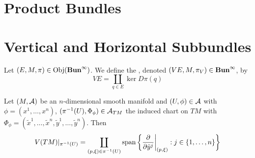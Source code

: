 \documentclass{book}
\begin{document}
	
	
	
	
	
	
	
	
	
	
	
	
	
	
	
	
	
	
	
	
	
	
	
	
	
	
	
	
	
	
	
	\newpage
	\section{Product Bundles}
	
	\begin{defn}
		
	\end{defn}
	
	
	
	
	
	
	
	
	
	
	
	
	
	
	
	
	
	
	
	
	
	
	
	
	
	
	
	
	
	
	
	
	
	
	
	
	
	
	
	
	
	
	\newpage
	\section{Vertical and Horizontal Subbundles}
	
	\begin{defn}
		Let $(E, M, \pi) \in \operatorname{Obj}(\operatorname*{\text{\textbf{Bun}}^{\infty}})$. We define the , denoted $(VE, M, \pi_{V}) \in \operatorname*{\text{\textbf{Bun}}^{\infty}}$, by 
		$$VE = \coprod_{q \in E} \ker D\pi(q)$$
	\end{defn}
	
	
	\begin{ex}
		Let $(M, \mathcal{A})$ be an $n$-dimensional smooth manifold and $(U, \phi) \in \mathcal{A}$ with $\phi = (x^1, \ldots, x^n)$,  $(\pi^{-1}(U), \Phi_{\phi}) \in \mathcal{A}_{TM}$ the induced chart on $TM$ with $\Phi_{\phi} = (\tilde{x}^1, \ldots, \tilde{x}^n,  \tilde{y}^1, \ldots, \tilde{y}^n)$. Then 
		$$V(TM)|_{\pi^{-1}(U)} = \coprod_{(p, \xi) \in \pi^{-1}(U)} \operatorname{span} \bigg \{ \frac{\partial}{\partial \tilde{y}^j} \bigg|_{(p, \xi)}: j \in \{1, \ldots, n\} \bigg \}$$
	\end{ex}
	
\end{document}
